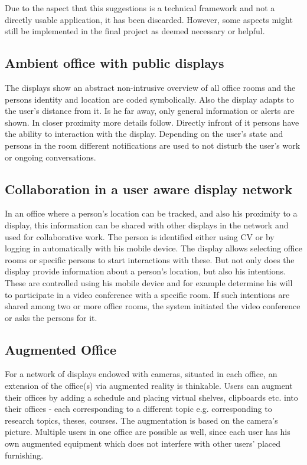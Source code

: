 Due to the aspect that this suggestions is a technical framework and not a directly usable application, it has been discarded.
However, some aspects might still be implemented in the final project as deemed necessary or helpful.

\subsection{Ambient office with public displays}
The displays show an abstract non-intrusive overview of all office rooms and the persons identity and location are coded symbolically.
Also the display adapts to the user's distance from it.
Is he far away, only general information or alerts are shown.
In closer proximity more details follow. 
Directly infront of it persons have the ability to interaction with the display.
Depending on the user's state and persons in the room different notifications are used to not disturb the user's work or ongoing conversations.

\subsection{Collaboration in a user aware display network}
In an office where a person's location can be tracked, and also his proximity to a display, this information can be shared with other displays in the network and used for collaborative work.
The person is identified either using CV or by logging in automatically with his mobile device.
The display allows selecting office rooms or specific persons to start interactions with these.
But not only does the display provide information about a person's location, but also his intentions.
These are controlled using his mobile device and for example determine his will to participate in a video conference with a specific room.
If such intentions are shared among two or more office rooms, the system initiated the video conference or asks the persons for it.


\subsection{Augmented Office}
For a network of displays endowed with cameras, situated in each office, an extension of the office(s) via augmented reality is thinkable.
Users can augment their offices by adding a schedule and placing virtual shelves, clipboards etc. into their offices - each corresponding to a different topic e.g. corresponding to research topics, theses, courses.
The augmentation is based on the camera's picture.
Multiple users in one office are possible as well, since each user has his own augmented equipment which does not interfere with other users' placed furnishing.


